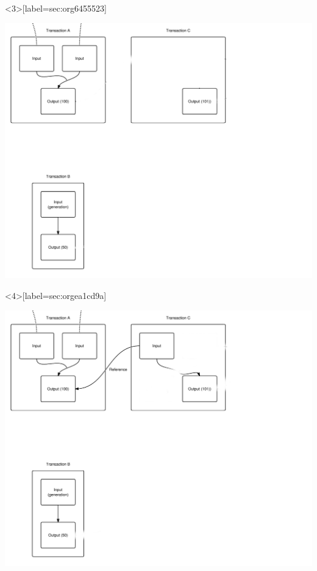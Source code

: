 \documentclass[presentation]{beamer}
\begin{document}
\begin{frame}<3>[label={sec:org6455523}]{}
\begin{center}
\includegraphics[width=.9\textwidth]{Images/Transaction3.png}
\end{center}
\end{frame}
\begin{frame}<4>[label={sec:orgea1cd9a}]{}
\begin{center}
\includegraphics[width=.9\textwidth]{Images/Transaction4.png}
\end{center}
\end{frame}
\end{document}
